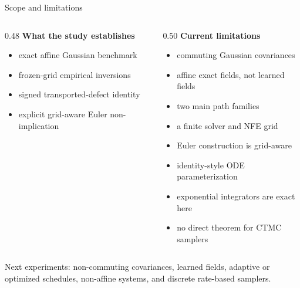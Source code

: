 \documentclass[aspectratio=169,10pt,c]{beamer}
\newcommand{\citefoot}[1]{{\tiny\color{fsgray}\citep{#1}}}
\begin{document}
\begin{frame}{Scope and limitations}
  \footnotesize
  \begin{columns}[T,onlytextwidth]
    \begin{column}{0.48\textwidth}
      {\color{fsblue}\textbf{What the study establishes}}
      \begin{itemize}\itemsep=0.14em
        \item exact affine Gaussian benchmark
        \item frozen-grid empirical inversions
        \item signed transported-defect identity
        \item explicit grid-aware Euler non-implication
      \end{itemize}
    \end{column}
    \begin{column}{0.50\textwidth}
      {\color{fsorange}\textbf{Current limitations}}
      \begin{itemize}\itemsep=0.10em
        \item commuting Gaussian covariances
        \item affine exact fields, not learned fields
        \item two main path families
        \item a finite solver and NFE grid
        \item Euler construction is grid-aware
        \item identity-style ODE parameterization
        \item exponential integrators are exact here
        \item no direct theorem for CTMC samplers
      \end{itemize}
    \end{column}
  \end{columns}

  \vspace{0.16cm}
  Next experiments: non-commuting covariances, learned fields, adaptive or
  optimized schedules, non-affine systems, and discrete rate-based samplers.
  \vspace{0.06cm}
  \citefoot{lu2022dpmsolver,zhang2023deis}
\end{frame}
\end{document}
